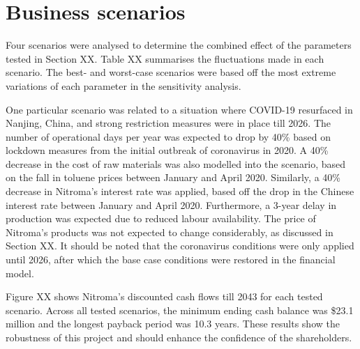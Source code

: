 

\section{Business scenarios}
Four scenarios were analysed to determine the combined effect of the parameters tested in Section XX. Table XX summarises the fluctuations made in each scenario. The best- and worst-case scenarios were based off the most extreme variations of each parameter in the sensitivity analysis. 

One particular scenario was related to a situation where COVID-19 resurfaced in Nanjing, China, and strong restriction measures were in place till 2026. The number of operational days per year was expected to drop by 40\% based on lockdown measures from the initial outbreak of coronavirus in 2020. A 40\% decrease in the cost of raw materials was also modelled into the scenario, based on the fall in toluene prices between January and April 2020. Similarly, a 40\% decrease in Nitroma’s interest rate was applied, based off the drop in the Chinese interest rate between January and April 2020. Furthermore, a 3-year delay in production was expected due to reduced labour availability. The price of Nitroma’s products was not expected to change considerably, as discussed in Section XX. It should be noted that the coronavirus conditions were only applied until 2026, after which the base case conditions were restored in the financial model.

Figure XX shows Nitroma’s discounted cash flows till 2043 for each tested scenario. Across all tested scenarios, the minimum ending cash balance was \$23.1 million and the longest payback period was 10.3 years. These results show the robustness of this project and should enhance the confidence of the shareholders.
